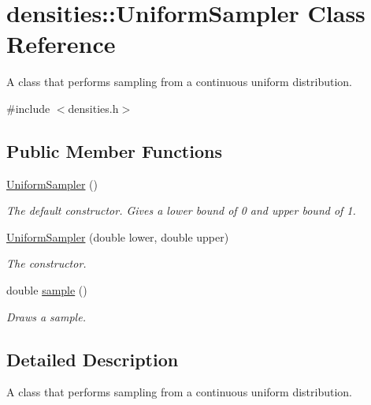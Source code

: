 \hypertarget{classdensities_1_1UniformSampler}{}\section{densities\+:\+:Uniform\+Sampler Class Reference}
\label{classdensities_1_1UniformSampler}


A class that performs sampling from a continuous uniform distribution.  




{\ttfamily \#include $<$densities.\+h$>$}

\subsection*{Public Member Functions}
\begin{DoxyCompactItemize}
\item 
\hyperlink{classdensities_1_1UniformSampler_a29714b42a62dd91603d42b3a2b82eec8}{Uniform\+Sampler} ()\hypertarget{classdensities_1_1UniformSampler_a29714b42a62dd91603d42b3a2b82eec8}{}\label{classdensities_1_1UniformSampler_a29714b42a62dd91603d42b3a2b82eec8}

\begin{DoxyCompactList}\small\item\em The default constructor. Gives a lower bound of 0 and upper bound of 1. \end{DoxyCompactList}\item 
\hyperlink{classdensities_1_1UniformSampler_a8dbc3ef50efd8b6b9aa64819f7f71095}{Uniform\+Sampler} (double lower, double upper)
\begin{DoxyCompactList}\small\item\em The constructor. \end{DoxyCompactList}\item 
double \hyperlink{classdensities_1_1UniformSampler_a1c4ab518cac3aecb0f4aa199cbc7a312}{sample} ()
\begin{DoxyCompactList}\small\item\em Draws a sample. \end{DoxyCompactList}\end{DoxyCompactItemize}


\subsection{Detailed Description}
A class that performs sampling from a continuous uniform distribution. 

